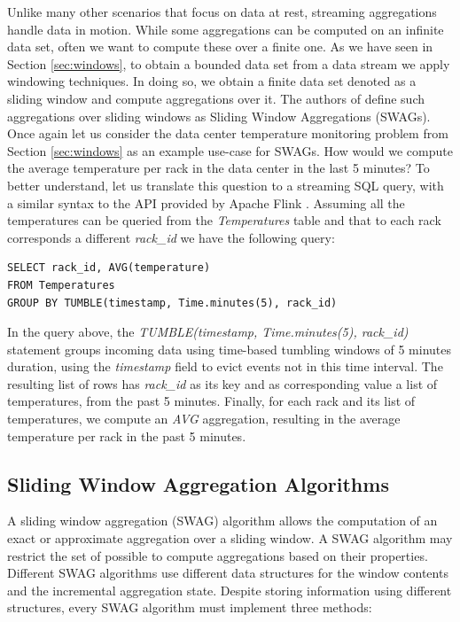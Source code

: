 Unlike many other scenarios that focus on data at rest, streaming aggregations handle data in motion. While some aggregations can be computed on an infinite data set, often we want to compute these over a finite one. As we have seen in Section \ref{sec:windows}, to obtain a bounded data set from a data stream we apply windowing techniques. In doing so, we obtain a finite data set denoted as a sliding window and compute aggregations over it. The authors of \cite{Tangwongsan-Sliding-Window-Aggregation-Algorithms} define such aggregations over sliding windows as Sliding Window Aggregations (SWAGs). Once again let us consider the data center temperature monitoring problem from Section \ref{sec:windows} as an example use-case for SWAGs. How would we compute the average temperature per rack in the data center in the last 5 minutes? To better understand, let us translate this question to a streaming SQL query, with a similar syntax to the API provided by Apache Flink \cite{flink}. Assuming all the temperatures can be queried from the \textit{Temperatures} table and that to each rack corresponds a different \textit{rack\_id} we have the following query:

\begin{verbatim}
SELECT rack_id, AVG(temperature)
FROM Temperatures
GROUP BY TUMBLE(timestamp, Time.minutes(5), rack_id)
\end{verbatim}

In the query above, the \textit{TUMBLE(timestamp, Time.minutes(5), rack\_id)} statement groups incoming data using time-based tumbling windows of 5 minutes duration, using the \textit{timestamp} field to evict events not in this time interval. The resulting list of rows has \textit{rack\_id} as its key and as corresponding value a list of temperatures, from the past 5 minutes. Finally, for each rack and its list of temperatures, we compute an \textit{AVG} aggregation, resulting in the average temperature per rack in the past 5 minutes.


\subsection{Sliding Window Aggregation Algorithms} \label{sec:back-swag-algs}

A sliding window aggregation (SWAG) algorithm allows the computation of an exact or approximate aggregation over a sliding window. A SWAG algorithm may restrict the set of possible to compute aggregations based on their properties. Different SWAG algorithms use different data structures for the window contents and the incremental aggregation state. Despite storing information using different structures, every SWAG algorithm must implement three methods:

